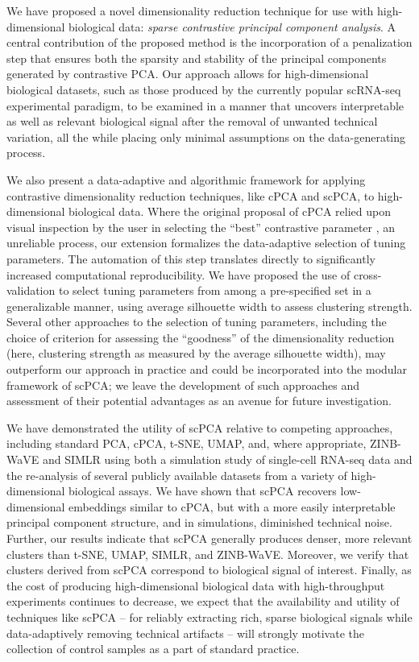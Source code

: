 We have proposed a novel dimensionality reduction technique for use with high-dimensional biological data: \textit{sparse contrastive principal component analysis}. A central contribution of the proposed method is the incorporation of a penalization step that ensures both the sparsity and stability of the principal components generated by contrastive PCA. Our approach allows for high-dimensional biological datasets, such as those produced by the currently popular scRNA-seq experimental paradigm, to be examined in a manner that uncovers interpretable as well as relevant biological signal after the removal of unwanted technical variation, all the while placing only minimal assumptions on the data-generating process.

We also present a data-adaptive and algorithmic framework for applying contrastive dimensionality reduction techniques, like cPCA and scPCA, to high-dimensional biological data. Where the original proposal of cPCA relied upon visual inspection by the user in selecting the ``best'' contrastive parameter \citep{Abid2018}, an unreliable process, our extension formalizes the data-adaptive selection of tuning parameters. The automation of this step translates directly to significantly increased computational reproducibility. We have proposed the use of cross-validation to select tuning parameters from among a pre-specified set in a generalizable manner, using average silhouette width to assess clustering strength. Several other approaches to the selection of tuning parameters, including the choice of criterion for assessing the ``goodness'' of the dimensionality reduction (here, clustering strength as measured by the average silhouette width), may outperform our approach in practice and could be incorporated into the modular framework of scPCA; we leave the development of such approaches and assessment of their potential advantages as an avenue for future investigation.

We have demonstrated the utility of scPCA relative to competing approaches, including standard PCA, cPCA, t-SNE, UMAP, and, where appropriate,  ZINB-WaVE and SIMLR using both a simulation study of single-cell RNA-seq data and the re-analysis of several publicly available datasets from a variety of high-dimensional biological assays. We have shown that scPCA recovers low-dimensional embeddings similar to cPCA, but with a more easily interpretable principal component structure, and in simulations, diminished technical noise. Further, our results indicate that scPCA generally produces denser, more relevant clusters than t-SNE, UMAP, SIMLR, and ZINB-WaVE. Moreover, we verify that clusters derived from scPCA correspond to biological signal of interest. Finally, as the cost of producing high-dimensional biological data with high-throughput experiments continues to decrease, we expect that the availability and utility of techniques like scPCA -- for reliably extracting rich, sparse biological signals while data-adaptively removing technical artifacts -- will strongly motivate the collection of control samples as a part of standard practice.
